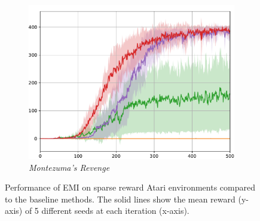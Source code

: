 \documentclass[10pt,mathserif]{beamer}
\begin{document}
\begin{frame}
\begin{figure}[ht!]
{\begin{subfigure}{0.32\textwidth}
        \includegraphics[width=\textwidth]{emi_figures/MontezumaRevenge_all.pdf}
        \caption{\textit{Montezuma's Revenge}}
    \end{subfigure}
  }
  \caption{Performance of EMI on sparse reward Atari environments compared to the baseline methods. The solid lines show the mean reward (y-axis) of 5 different seeds at each iteration (x-axis).}
\end{figure}
\end{frame}

\end{document}
